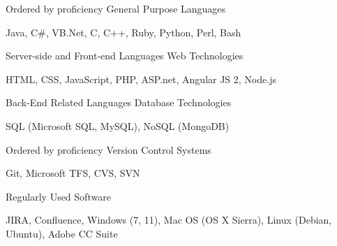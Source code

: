 \begin{cventries}
  \cventry
    {Ordered by proficiency}
    {General Purpose Languages}
    { }
    { }
    {
      \begin{cvitems}
        \item {Java, C\#, VB.Net, C, C++, Ruby, Python, Perl, Bash}
      \end{cvitems}
    }
  \cventry
    {Server-side and Front-end Languages}
    {Web Technologies}
    { }
    { }
    {
      \begin{cvitems}
        \item {HTML, CSS, JavaScript, PHP, ASP.net, Angular JS 2, Node.js}
      \end{cvitems}
    }
  \cventry
    {Back-End Related Languages}
    {Database Technologies}
    { }
    { }
    {
      \begin{cvitems}
        \item {SQL (Microsoft SQL, MySQL), NoSQL (MongoDB)}
      \end{cvitems}
    }
  \cventry
    {Ordered by proficiency}
    {Version Control Systems}
    { }
    { }
    {
      \begin{cvitems}
        \item {Git, Microsoft TFS, CVS, SVN}
      \end{cvitems}
    }
  \cventry
    {Regularly Used}
    {Software}
    { }
    { }
    {
      \begin{cvitems}
        \item {JIRA, Confluence, Windows (7, 11), Mac OS (OS X Sierra), Linux (Debian, Ubuntu), Adobe CC Suite}
      \end{cvitems}
    }
\end{cventries}
